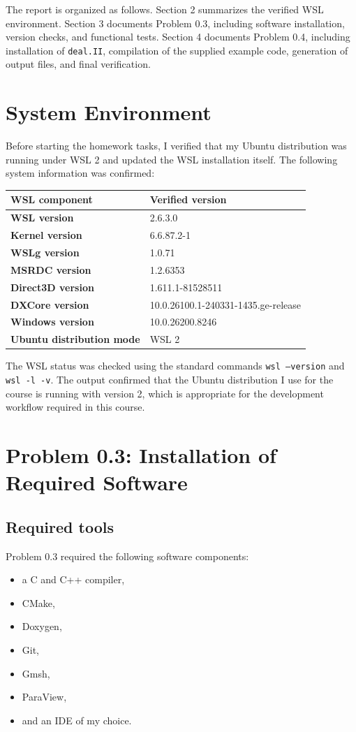 \documentclass[11pt,a4paper]{article}
\begin{document}
The report is organized as follows. Section 2 summarizes the verified WSL environment. Section 3 documents Problem 0.3, including software installation, version checks, and functional tests. Section 4 documents Problem 0.4, including installation of \texttt{deal.II}, compilation of the supplied example code, generation of output files, and final verification.

\pagebreak

\section{System Environment}
Before starting the homework tasks, I verified that my Ubuntu distribution was running under WSL 2 and updated the WSL installation itself. The following system information was confirmed:

\begin{center}
\renewcommand{\arraystretch}{1.2}
\begin{tabular}{>{\bfseries}p{}p{}}
\toprule
WSL component & Verified version \\
\midrule
WSL version & 2.6.3.0 \\
Kernel version & 6.6.87.2-1 \\
WSLg version & 1.0.71 \\
MSRDC version & 1.2.6353 \\
Direct3D version & 1.611.1-81528511 \\
DXCore version & 10.0.26100.1-240331-1435.ge-release \\
Windows version & 10.0.26200.8246 \\
Ubuntu distribution mode & WSL 2 \\
\bottomrule
\end{tabular}
\end{center}

The WSL status was checked using the standard commands \texttt{wsl --version} and \texttt{wsl -l -v}. The output confirmed that the Ubuntu distribution I use for the course is running with version 2, which is appropriate for the development workflow required in this course.

\pagebreak

\section{Problem 0.3: Installation of Required Software}
\subsection{Required tools}
Problem 0.3 required the following software components:
\begin{itemize}[leftmargin=1.5em]
    \item a C and C++ compiler,
    \item CMake,
    \item Doxygen,
    \item Git,
    \item Gmsh,
    \item ParaView,
    \item and an IDE of my choice.
\end{itemize}
\end{document}
